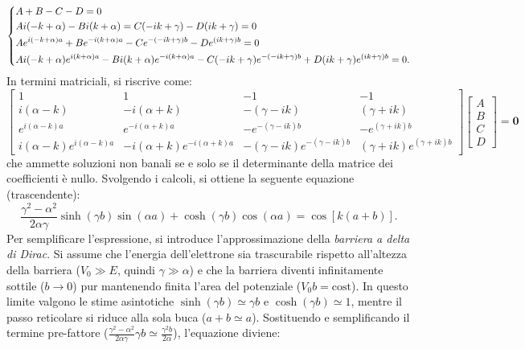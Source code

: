 \documentclass[a4paper,11pt]{report}
\begin{document}
\begin{equation}
\begin{dcases}
A+B-C-D = 0 \\
Ai(-k+\alpha) -Bi(k+\alpha) = C(-ik+\gamma)-D(ik + \gamma) = 0 \\
Ae^{i(-k+\alpha)a} + Be^{-i(k+\alpha)a} - Ce^{-(-ik+\gamma)b}-De^{(ik+\gamma)b} = 0 \\
Ai(-k+\alpha)e^{i(k+\alpha)a} -Bi(k+\alpha)e^{-i(k+\alpha)a} - C(-ik+\gamma)e^{-(-ik+\gamma)b}+D(ik + \gamma)e^{(ik+\gamma)b} = 0.
\end{dcases}
\end{equation}
In termini matriciali, si riscrive come:
\begin{equation}
\begin{bmatrix}
1 & 1 & -1 & -1 \\[10pt]
i(\alpha-k) & -i(\alpha+k) & -(\gamma-ik) & (\gamma+ik) \\[10pt]
e^{i(\alpha-k)a} & e^{-i(\alpha+k)a} & -e^{-(\gamma-ik)b} & -e^{(\gamma+ik)b} \\[10pt]
i(\alpha-k)e^{i(\alpha-k)a} & -i(\alpha+k)e^{-i(\alpha+k)a} & -(\gamma-ik)e^{-(\gamma-ik)b} & (\gamma+ik)e^{(\gamma+ik)b}
\end{bmatrix}
\begin{bmatrix}
A \\
B \\
C \\
D
\end{bmatrix}
= \bm{0}
\end{equation}
che ammette soluzioni non banali se e solo se il determinante della matrice dei coefficienti è nullo. Svolgendo i calcoli, si ottiene la seguente equazione (trascendente):
\begin{equation}
    \frac{\gamma^2-\alpha^2}{2\alpha \gamma}\sinh(\gamma b)\sin(\alpha a) + \cosh(\gamma b)\cos(\alpha a) = \cos[k(a+b)].
\end{equation}
Per semplificare l'espressione, si introduce l'approssimazione della \textit{barriera a delta di Dirac}. Si assume che l'energia dell'elettrone sia trascurabile rispetto all'altezza della barriera ($V_0 \gg E$, quindi $\gamma \gg \alpha$) e che la barriera diventi infinitamente sottile ($b \to 0$) pur mantenendo finita l'area del potenziale ($V_0 b = \text{cost}$).
In questo limite valgono le stime asintotiche $\sinh(\gamma b) \simeq \gamma b$ e $\cosh(\gamma b) \simeq 1$, mentre il passo reticolare si riduce alla sola buca ($a+b \simeq a$).
Sostituendo e semplificando il termine pre-fattore ($\frac{\gamma^2-\alpha^2}{2\alpha\gamma} \gamma b \simeq \frac{\gamma^2 b}{2\alpha}$), l'equazione diviene:
\end{document}
